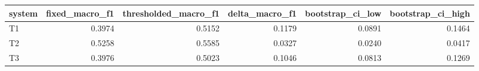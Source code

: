 \begin{tabular}{lrrrrr}
\toprule
system & fixed_macro_f1 & thresholded_macro_f1 & delta_macro_f1 & bootstrap_ci_low & bootstrap_ci_high \\
\midrule
T1 & 0.3974 & 0.5152 & 0.1179 & 0.0891 & 0.1464 \\
T2 & 0.5258 & 0.5585 & 0.0327 & 0.0240 & 0.0417 \\
T3 & 0.3976 & 0.5023 & 0.1046 & 0.0813 & 0.1269 \\
\bottomrule
\end{tabular}

